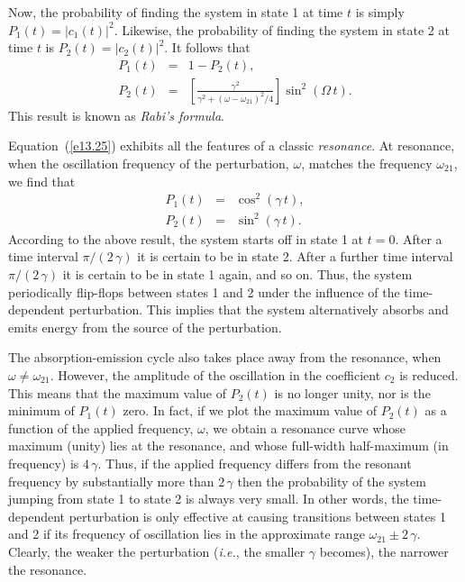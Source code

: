 Now, the probability of finding the system in state 1 at time $t$ is
simply $P_1(t)=|c_1(t)|^2$. Likewise, the probability of finding the system
in state 2 at time $t$ is $P_2(t)= |c_2(t)|^2$. It follows that
\begin{eqnarray}
P_1(t)&=&1-P_2(t),\\[0.5ex]
P_2(t)&=& \left[\frac{\gamma^2}{\gamma^2 + (\omega-\omega_{21})^2/4}\right]
\sin^2(\Omega\,t).\label{e13.25}
\end{eqnarray}
This result is known as {\em Rabi's formula}.

Equation~(\ref{e13.25}) exhibits all the features of a classic {\em resonance}.
At resonance, when the oscillation frequency of the perturbation, $\omega$,
matches the frequency $\omega_{21}$, we find that
\begin{eqnarray}
P_1(t)&=&\cos^2(\gamma\,t),\\[0.5ex]
P_2(t)&=&\sin^2(\gamma\,t).\label{e13.28}
\end{eqnarray}
According to the above result, the system starts off 
in state 1 at $t=0$. After a time interval $\pi/(2\,\gamma)$ it is certain to be
in state 2. After a further time interval $\pi/(2\,\gamma)$ it is certain
to be in state 1 again, and so on. Thus, the system periodically
flip-flops between states 1 and 2 under the influence of the time-dependent
perturbation. This implies that the system alternatively absorbs and emits
energy from the source of the perturbation.

The absorption-emission cycle also takes place away from the resonance,
when $\omega\neq \omega_{21}$. However, the amplitude of the
oscillation in the coefficient $c_2$ is reduced. This means that the maximum
value of $P_2(t)$ is no longer unity,  nor is the minimum of $P_1(t)$
zero. In fact, if we plot the maximum value of $P_2(t)$ as a function
of the applied frequency, $\omega$, we obtain a resonance curve whose
maximum (unity) lies at the resonance, and whose full-width half-maximum
(in frequency) is $4\,\gamma$. Thus, if the applied frequency differs
from the resonant frequency by substantially more than $2\,\gamma$
then the probability of the system jumping from state 1 to state 2 is
always very small. In other words, the time-dependent
perturbation is only effective at causing transitions between states 1 and 2
if its frequency of oscillation lies in the approximate
range $\omega_{21}\pm 2\,\gamma$. Clearly, the weaker
the perturbation ({\em i.e.}, the smaller $\gamma$ becomes), the narrower
the resonance.

